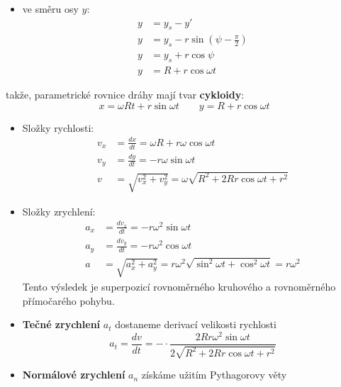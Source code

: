 \begin{example}
   \begin{itemize}
      \item ve směru osy \(y\): 
      \begin{align*}
        y &= y_s - y'                        \\
        y &= y_s - r\sin(\psi-\frac{\pi}{2}) \\
        y &= y_s + r\cos\psi                 \\
        y &= R + r\cos\omega t
      \end{align*}
    \end{itemize}

  takže, parametrické rovnice dráhy mají tvar \textbf{cykloidy}:
  \begin{equation*}
    x = \omega R t + r\sin\omega t  \qquad y = R + r\cos\omega t
  \end{equation*}
  \begin{itemize}
    \item Složky rychlosti:
      \begin{align*} 
       v_x &= \frac{dx}{dt} = \omega R + r\omega\cos\omega t                       \\
       v_y &= \frac{dy}{dt} = -r\omega\sin\omega t                                 \\
       v   &= \sqrt{v_x^2 + v_y^2}= \omega\sqrt{R^2 + 2Rr\cos\omega t + r^2}
      \end{align*}
    \item Složky zrychlení:
      \begin{align*}
        a_x &= \frac{dv_x}{dt} = -r\omega^2\sin\omega t                           \\
        a_y &= \frac{dv_y}{dt} = -r\omega^2\cos\omega t                           \\
        a   &= \sqrt{a_x^2 + a_y^2}= r\omega^2\sqrt{\sin^2\omega t + 
               \cos^2\omega t} = r\omega^2
      \end{align*}
      Tento výsledek je superpozicí rovnoměrného kruhového a rovnoměrného přímočarého pohybu.
    \item \textbf{Tečné zrychlení} \(a_t\) dostaneme derivací velikosti rychlosti
      \begin{equation*}
        a_t = \frac{dv}{dt} = -\cdot\frac{2Rr\omega^2\sin\omega t }{2\sqrt{R^2 + 
                2Rr\cos\omega t + r^2}}
      \end{equation*}
    \item \textbf{Normálové zrychlení} \(a_n\) získáme užitím Pythagorovy věty

\end{itemize}
\end{example}
